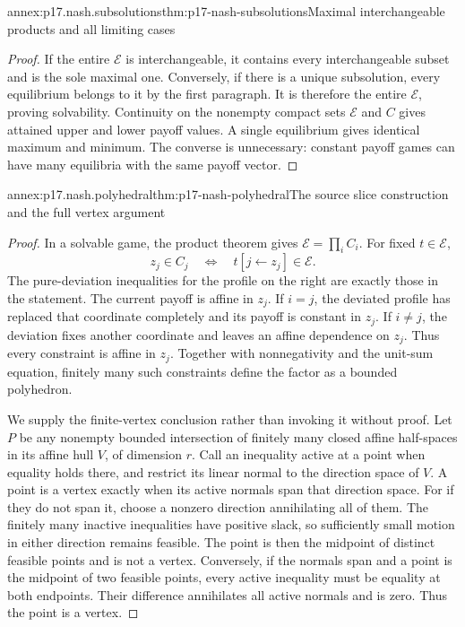\begin{annexitem}{annex:p17.nash.subsolutions}{thm:p17-nash-subsolutions}{Maximal interchangeable products and all limiting cases}
\begin{proof}
If the entire \(\mathcal E\) is interchangeable,
it contains every interchangeable subset and
is the sole maximal one. Conversely, if there
is a unique subsolution, every equilibrium
belongs to it by the first paragraph. It is
therefore the entire \(\mathcal E\), proving
solvability. Continuity on the nonempty compact
sets \(\mathcal E\) and \(C\) gives attained
upper and lower payoff values. A single
equilibrium gives identical maximum and minimum.
The converse is unnecessary: constant payoff
games can have many equilibria with the
same payoff vector.
\end{proof}
\end{annexitem}

\begin{annexitem}{annex:p17.nash.polyhedral}{thm:p17-nash-polyhedral}{The source slice construction and the full vertex argument}
\begin{proof}
In a solvable game, the product theorem gives
\(\mathcal E=\prod_i C_i\). For fixed \(t\in\mathcal E\),
\[
                     z_j\in C_j
                    \quad\Longleftrightarrow\quad
                     t[j\leftarrow z_j]\in\mathcal E.
\]
The pure-deviation inequalities for the profile
on the right are exactly those in the statement.
The current payoff is affine in \(z_j\).
If \(i=j\), the deviated profile has replaced
that coordinate completely and its payoff is
constant in \(z_j\). If \(i\ne j\), the
deviation fixes another coordinate and leaves
an affine dependence on \(z_j\).
Thus every constraint is affine in \(z_j\).
Together with nonnegativity and the unit-sum
equation, finitely many such constraints
define the factor as a bounded polyhedron.

We supply the finite-vertex conclusion rather
than invoking it without proof. Let \(P\) be
any nonempty bounded intersection of finitely
many closed affine half-spaces in its affine
hull \(V\), of dimension \(r\).
Call an inequality active at a point when
equality holds there, and restrict its
linear normal to the direction space of \(V\).
A point is a vertex exactly when its active
normals span that direction space.
For if they do not span it, choose a nonzero
direction annihilating all of them.
The finitely many inactive inequalities have
positive slack, so sufficiently small motion
in either direction remains feasible.
The point is then the midpoint of distinct
feasible points and is not a vertex.
Conversely, if the normals span and a point
is the midpoint of two feasible points,
every active inequality must be equality
at both endpoints. Their difference
annihilates all active normals and is zero.
Thus the point is a vertex.


\end{proof}
\end{annexitem}
